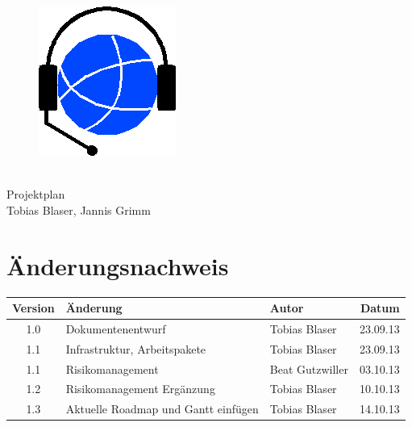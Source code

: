 

\providecommand{\documentType}{Projektplan}
\providecommand{\versionnumber}{1.0}



\thispagestyle{empty}
\begin{titlepage}
	\begin{center}

	\vspace*{40mm}
	
	\begin{figure}[htp]
		\centering
		\includegraphics[scale=0.60]{../img/icon-js-voip.png}
	\end{figure}		
	\vspace*{20mm}
	
	{\fontsize{40}{48} \selectfont \project \\[10mm]}
	{\fontsize{40}{48} \selectfont \documentType \\[5mm]}	
	\vspace*{20mm}
	Tobias Blaser, Jannis Grimm

\end{center}
\end{titlepage}
\clearpage

\chapter*{Änderungsnachweis}
\begin{tabularx}{\textwidth}{|cXlr|} %
		\hline
		\textbf{Version} & \textbf{Änderung} & \textbf{Autor} & \textbf{Datum}\\
		\hline
		1.0 & Dokumentenentwurf & Tobias Blaser & 23.09.13\\
		1.1 & Infrastruktur, Arbeitspakete & Tobias Blaser & 23.09.13\\
		1.1 & Risikomanagement & Beat Gutzwiller & 03.10.13\\
		1.2 & Risikomanagement Ergänzung & Tobias Blaser & 10.10.13\\
		1.3 & Aktuelle Roadmap und Gantt einfügen & Tobias Blaser & 14.10.13\\
		\hline
\end{tabularx}

\tableofcontents








